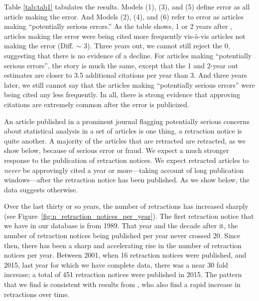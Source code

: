 \documentclass[12pt, letterpaper]{article}
\begin{document}
Table \ref{tab:tab1} tabulates the results. Models (1), (3), and (5) define error as all article making the error. And Models (2), (4), and (6) refer to error as articles making ``potentially serious errors.'' As the table shows, 1 or 2 years after \citet{nieuwenhuis2011}, articles making the error were being cited more frequently vis-\`a-vis articles not making the error (Diff. $\sim$ 3). Three years out, we cannot still reject the 0, suggesting that there is no evidence of a decline. For articles making ``potentially serious errors'', the story is much the same, except that the 1 and 2-year out estimates are closer to 3.5 additional citations per year than 3. And three years later, we still cannot say that the articles making ``potentially serious errors'' were being cited any less frequently.  In all, there is strong evidence that approving citations are extremely common after the error is publicized.



An article published in a prominent journal flagging potentially serious concerns about statistical analysis in a set of articles is one thing, a retraction notice is quite another. A majority of the articles that are retracted are retracted, as we show below, because of serious error or fraud. We expect a much stronger response to the publication of retraction notices. We expect retracted articles to \textit{never} be approvingly cited a year or more---taking account of long publication windows---after the retraction notice has been published. As we show below, the data suggests otherwise. 

Over the last thirty or so years, the number of retractions has increased sharply (see Figure~\ref{fig:n_retraction_notices_per_year}). The first retraction notice that we have in our database is from 1989. That year and the decade after it, the number of retraction notices being published per year never crossed 20. Since then, there has been a sharp and accelerating rise in the number of retraction notices per year. Between 2001, when 16 retraction notices were published, and 2015, last year for which we have complete data, there was a near 30 fold increase; a total of 451 retraction notices were published in 2015. The pattern that we find is consistent with results from \citet{steen2013has}, who also find a rapid increase in retractions over time.
\end{document}
